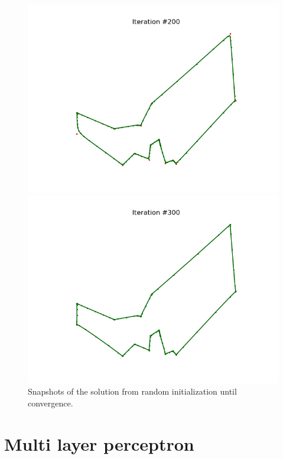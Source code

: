 \documentclass[DIV=12, ngerman, fontsize=12pt, parskip=half]{scrreprt}
\begin{document}
\begin{figure}[H]
\begin{center}
\begin{minipage}[b]{0.45\textwidth}
				\includegraphics[width=\textwidth]{TSP_200}
			\end{minipage}
			\begin{minipage}[b]{0.45\textwidth}
			\includegraphics[width=\textwidth]{TSP_300}
			\end{minipage}
			\caption{Snapshots of the solution from random initialization until convergence.}
		\end{center}
	\end{figure}


	\chapter{Multi layer perceptron}
	
\end{document}
